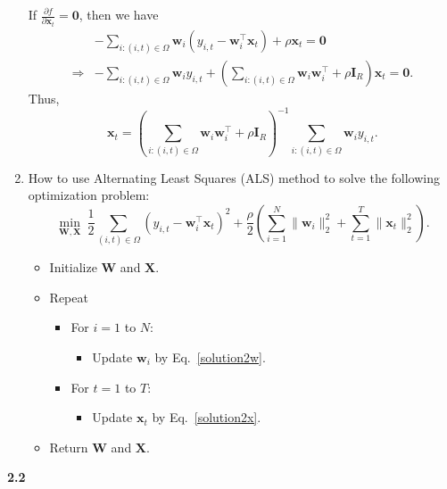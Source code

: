 \documentclass[12pt]{article}
\begin{document}
\begin{enumerate}
{If $\frac{\partial f}{\partial \boldsymbol{x}_{t}}=\boldsymbol{0}$, then we have
\begin{equation}
\begin{aligned}
&-\sum_{i:(i,t)\in\Omega}\boldsymbol{w}_{i}\left(y_{i,t}-\boldsymbol{w}_{i}^{\top}\boldsymbol{x}_{t}\right)+\rho\boldsymbol{x}_{t}=\boldsymbol{0} \\
\Longrightarrow&-\sum_{i:(i,t)\in\Omega}\boldsymbol{w}_{i}y_{i,t}+\left(\sum_{i:(i,t)\in\Omega}\boldsymbol{w}_{i}\boldsymbol{w}_{i}^{\top}+\rho\boldsymbol{I}_{R}\right)\boldsymbol{x}_{t}=\boldsymbol{0}.
\end{aligned}
\end{equation}
Thus,
\begin{equation}\label{solution2x}
\boldsymbol{x}_{t}=\left(\sum_{i:(i,t)\in\Omega}\boldsymbol{w}_{i}\boldsymbol{w}_{i}^{\top}+\rho\boldsymbol{I}_{R}\right)^{-1}\sum_{i:(i,t)\in\Omega}\boldsymbol{w}_{i}y_{i,t}.
\end{equation}
}

\item How to use Alternating Least Squares (ALS) method to solve the following optimization problem:
\begin{equation}
\min_{\boldsymbol{W},\boldsymbol{X}}~\frac{1}{2}\sum_{(i,t)\in\Omega}\left(y_{i,t}-\boldsymbol{w}_{i}^{\top}\boldsymbol{x}_{t}\right)^{2}+\frac{\rho}{2}\left(\sum_{i=1}^{N}\|\boldsymbol{w}_{i}\|_{2}^{2}+\sum_{t=1}^{T}\|\boldsymbol{x}_{t}\|_{2}^{2}\right).
\end{equation}

{\color{red}
\begin{itemize}
\item Initialize $\boldsymbol{W}$ and $\boldsymbol{X}$.
\item Repeat
\begin{itemize}
\item[\textbullet] For $i=1$ to $N$:
\begin{itemize}
\item[\textbullet] Update $\boldsymbol{w}_{i}$ by Eq.~\eqref{solution2w}.
\end{itemize}
\item[\textbullet] For $t=1$ to $T$:
\begin{itemize}
\item[\textbullet] Update $\boldsymbol{x}_{t}$ by Eq.~\eqref{solution2x}.
\end{itemize}
\end{itemize}
\item Return $\boldsymbol{W}$ and $\boldsymbol{X}$.
\end{itemize}
}

\end{enumerate}

\bigskip\bigskip

\noindent\textbf{2.2}
\end{document}
